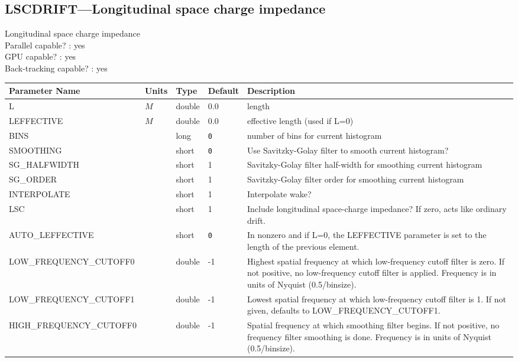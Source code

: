 \subsection{LSCDRIFT---Longitudinal space charge impedance}
Longitudinal space charge impedance
\\
Parallel capable? : yes\\
GPU capable? : yes\\
Back-tracking capable? : yes\\
\begin{tabular}{|l|l|l|l|p{\descwidth}|} \hline
Parameter Name & Units & Type & Default & Description \\ \hline 
L & $M$ & double &  0.0 & length  \\ \hline 
LEFFECTIVE & $M$ & double &  0.0 & effective length (used if L=0)  \\ \hline 
BINS &  & long &  \verb|0| & number of bins for current histogram  \\ \hline 
SMOOTHING &  & short &  \verb|0| & Use Savitzky-Golay filter to smooth current histogram?  \\ \hline 
SG\_HALFWIDTH &  & short &   1               & Savitzky-Golay filter half-width for smoothing current histogram  \\ \hline 
SG\_ORDER &  & short &   1               & Savitzky-Golay filter order for smoothing current histogram  \\ \hline 
INTERPOLATE &  & short &   1               & Interpolate wake?  \\ \hline 
LSC &  & short &   1               & Include longitudinal space-charge impedance?  If zero, acts like ordinary drift.  \\ \hline 
AUTO\_LEFFECTIVE &  & short &  \verb|0| & In nonzero and if L=0, the LEFFECTIVE parameter is set to the length of the previous element.  \\ \hline 
LOW\_FREQUENCY\_CUTOFF0 &  & double &   -1 & Highest spatial frequency at which low-frequency cutoff filter is zero.  If not positive, no low-frequency cutoff filter is applied. Frequency is in units of Nyquist (0.5/binsize).  \\ \hline 
LOW\_FREQUENCY\_CUTOFF1 &  & double &   -1 & Lowest spatial frequency at which low-frequency cutoff filter is 1.  If not given, defaults to LOW\_FREQUENCY\_CUTOFF1.  \\ \hline 
HIGH\_FREQUENCY\_CUTOFF0 &  & double &   -1 & Spatial frequency at which smoothing filter begins.  If not positive, no frequency filter smoothing is done.  Frequency is in units of Nyquist (0.5/binsize).  \\ \hline 
\end{tabular}

